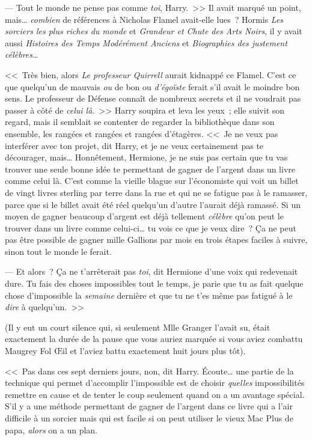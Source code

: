 --- Tout le monde ne pense pas comme \emph{toi}, Harry.~>> Il avait marqué un point, mais… \emph{combien} de références à Nicholas Flamel avait-elle lues~? Hormis \emph{Les sorciers les plus riches du monde} et \emph{Grandeur et Chute des Arts Noirs}, il y avait aussi \emph{Histoires des Temps Modérément Anciens} et \emph{Biographies des justement célèbres}…

<<~Très bien, alors \emph{Le professeur Quirrell} aurait kidnappé ce Flamel. C'est ce que quelqu'un de mauvais \emph{ou} de bon ou \emph{d'égoïste} ferait s'il avait le moindre bon sens. Le professeur de Défense connaît de nombreux secrets et il ne voudrait pas passer à côté de \emph{celui là}.~>> Harry soupira et leva les yeux~; elle suivit son regard, mais il semblait se contenter de regarder la bibliothèque dans son ensemble, les rangées et rangées et rangées d'étagères. <<~Je ne veux pas interférer avec ton projet, dit Harry, et je ne veux certainement pas te décourager, mais… Honnêtement, Hermione, je ne suis pas certain que tu vas trouver une seule bonne idée te permettant de gagner de l'argent dans un livre comme celui là. C'est comme la vieille blague sur l'économiste qui voit un billet de vingt livres sterling par terre dans la rue et qui ne se fatigue pas à le ramasser, parce que si le billet avait été réel quelqu'un d'autre l'aurait déjà ramassé. Si un moyen de gagner beaucoup d'argent est déjà tellement \emph{célèbre} qu'on peut le trouver dans un livre comme celui-ci… tu vois ce que je veux dire~? Ça ne peut pas être possible de gagner mille Gallions par mois en trois étapes faciles à suivre, sinon tout le monde le ferait.

--- Et alors~? Ça ne t'arrêterait pas \emph{toi}, dit Hermione d'une voix qui redevenait dure. Tu fais des choses impossibles tout le temps, je parie que tu as fait quelque chose d'impossible la \emph{semaine} dernière et que tu ne t'es même pas fatigué à le \emph{dire} à quelqu'un.~>>

(Il y eut un court silence qui, si seulement Mlle Granger l'avait su, était exactement la durée de la pause que vous auriez marquée si vous aviez combattu Maugrey Fol Œil et l'aviez battu exactement huit jours plus tôt).

<<~Pas dans ces sept derniers jours, non, dit Harry. Écoute… une partie de la technique qui permet d'accomplir l'impossible est de choisir \emph{quelles} impossibilités remettre en cause et de tenter le coup seulement quand on a un avantage spécial. S'il y a une méthode permettant de gagner de l'argent dans ce livre qui a l'air difficile à un sorcier mais qui est facile si on peut utiliser le vieux Mac Plus de papa, \emph{alors} on a un plan.

